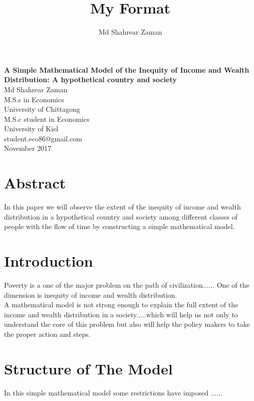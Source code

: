\documentclass[12pt,a4paper]{article}
\author{Md Shahrear Zaman}
\title{My Format}
\begin{document}
	 \begin{center}
	 	{\textbf{\huge A Simple Mathematical Model of the Inequity of Income and Wealth Distribution: A hypothetical country and society }}	
	     \vspace{1.5cm}
	 	 \\ Md Shahrear Zaman
	 	 \bigskip
	 	 \\M.S.s in Economics
	 	 \\University of Chittagong
	 	 \\M.S.c student in Economics
	 	 \\University of Kiel
	 	 \medskip
	 	 \\student.eco86@gmail.com
	 	 \bigskip
	 	 \\November 2017
	 	 
	 	\end{center}
	\newpage
	\tableofcontents
	\newpage
	\section{Abstract}
In this paper we will observe the extent of the inequity of income and wealth distribution in a hypothetical country and society among different classes of people with the flow of time by constructing a simple mathematical model.		
		

	\section{Introduction}
Poverty is a one of the major problem on the path of civilization...... One of the dimension is inequity of income and wealth distribution. 
\medskip
\\A mathematical model is not strong enough to explain the full extent of the income and wealth distribution in a society.....which will help us not only to understand the core of this problem but also will help the policy makers to take the proper action and steps.                
                   
  \section{Structure of The Model}
	In this simple mathematical model some restrictions have imposed ......   
	
\end{document}
